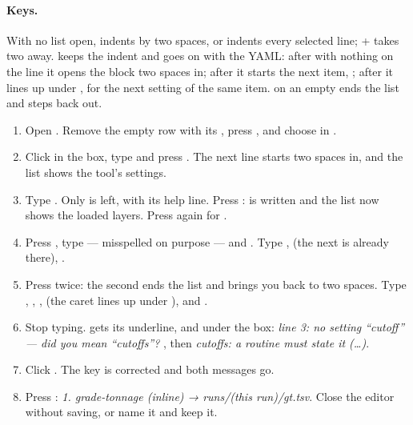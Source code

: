 \paragraph{Keys.} With no list open,  indents by two spaces, or indents every selected line; + takes two away.  keeps the indent and goes on with the YAML: after  with nothing on the line it opens the block two spaces in; after  it starts the next item, \code{- }; after  it lines up under , for the next setting of the same item.  on an empty \code{- } ends the list and steps back out.


\begin{tryit}
\begin{enumerate}
\item Open . Remove the empty  row with its , press , and choose  in .
\item Click in the box, type  and press . The next line starts two spaces in, and the list shows the tool's settings.
\item Type . Only  is left, with its help line. Press :  is written and the list now shows the loaded layers. Press  again for .
\item Press , type  — misspelled on purpose — and . Type ,  (the next \code{- } is already there), .
\item Press  twice: the second ends the list and brings you back to two spaces. Type , , ,  (the caret lines up under ), and .
\item Stop typing.  gets its underline, and under the box: \emph{line 3: no setting “cutoff” — did you mean “cutoffs”?} , then \emph{cutoffs: a routine must state it (…)}.
\item Click . The key is corrected and both messages go.
\item Press : \emph{1. grade-tonnage (inline) → runs/(this run)/gt.tsv}. Close the editor without saving, or name it and keep it.
\end{enumerate}
\end{tryit}

